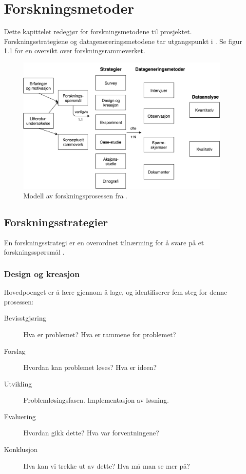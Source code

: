 \chapter{Forskningsmetoder}
\label{ch:method}
Dette kapittelet redegjør for forskningsmetodene til prosjektet. Forskningsstrategiene og datagenereringsmetodene
tar utgangspunkt i \citet{oates}. Se figur \ref{fig:oates_model} for en oversikt over forskningsrammeverket.

\begin{figure}
\centering
\includegraphics[width=0.95\textwidth]{fig/oates/oates_research_norwegian_final}
\caption{Modell av forskningsprosessen fra \citet{oates}.}
\label{fig:oates_model}
\end{figure}

\section{Forskningsstrategier}
En forskningsstrategi er en overordnet tilnærming for å svare på et forskningsspørsmål \citep[s. 35]{oates}.

\subsection{Design og kreasjon}
Hovedpoenget er å lære gjennom å lage, og \citet{oates} identifiserer fem steg for denne prosessen:

\begin{description}
  \item[Bevisstgjøring] Hva er problemet? Hva er rammene for problemet?
  \item[Forslag] Hvordan kan problemet løses? Hva er ideen?
  \item[Utvikling] Problemløsingsfasen. Implementasjon av løsning.
  \item[Evaluering] Hvordan gikk dette? Hva var forventningene?
  \item[Konklusjon] Hva kan vi trekke ut av dette? Hva må man se mer på?
\end{description}

